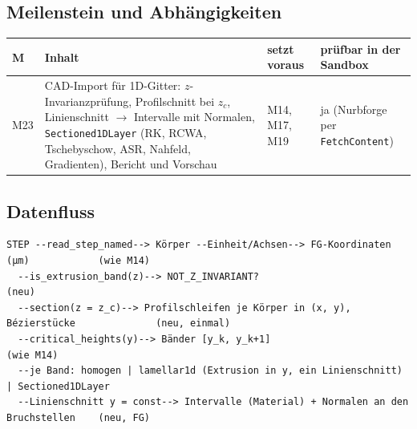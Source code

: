 \subsection{Meilenstein und Abhängigkeiten}
\begin{center}
\small
\begin{tabular}{p{1.0cm}p{6.6cm}p{3.0cm}p{3.8cm}}
\toprule
M & Inhalt & setzt voraus & prüfbar in der Sandbox \\
\midrule
M23 & CAD-Import für 1D-Gitter: $z$-Invarianzprüfung, Profilschnitt bei $z_c$, Linienschnitt $\to$ Intervalle mit
      Normalen, \verb|Sectioned1DLayer| (RK, RCWA, Tschebyschow, ASR, Nahfeld, Gradienten), Bericht und Vorschau
      & M14, M17, M19 & ja (Nurbforge per \verb|FetchContent|) \\
\bottomrule
\end{tabular}
\end{center}

\subsection{Datenfluss}
{\footnotesize\begin{verbatim}
STEP --read_step_named--> Körper --Einheit/Achsen--> FG-Koordinaten (µm)            (wie M14)
  --is_extrusion_band(z)--> NOT_Z_INVARIANT?                                           (neu)
  --section(z = z_c)--> Profilschleifen je Körper in (x, y), Bézierstücke              (neu, einmal)
  --critical_heights(y)--> Bänder [y_k, y_k+1]                                         (wie M14)
  --je Band: homogen | lamellar1d (Extrusion in y, ein Linienschnitt) | Sectioned1DLayer
  --Linienschnitt y = const--> Intervalle (Material) + Normalen an den Bruchstellen    (neu, FG)
\end{verbatim}}

